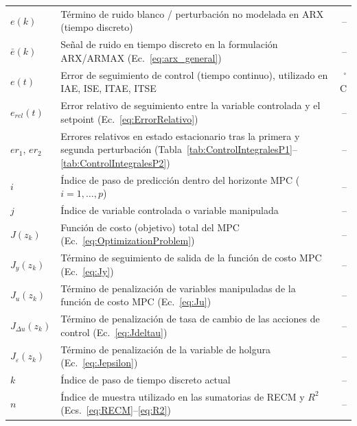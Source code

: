 \begin{longtable}{@{} l p{} r @{}}
$e(k)$
  & Término de ruido blanco / perturbación no modelada en ARX (tiempo discreto)
  & -- \\

$\bar{e}(k)$
  & Señal de ruido en tiempo discreto en la formulación ARX/ARMAX (Ec.~\ref{eq:arx_general})
  & -- \\

$e(t)$
  & Error de seguimiento de control (tiempo continuo), utilizado en IAE, ISE, ITAE, ITSE
  & $^{\circ}$C \\

$e_{rel}(t)$
  & Error relativo de seguimiento entre la variable controlada y el setpoint (Ec.~\ref{eq:ErrorRelativo})
  & -- \\

$er_1,\,er_2$
  & Errores relativos en estado estacionario tras la primera y segunda perturbación (Tabla~\ref{tab:ControlIntegralesP1}--\ref{tab:ControlIntegralesP2})
  & -- \\

$i$
  & Índice de paso de predicción dentro del horizonte MPC ($i=1,\ldots,p$)
  & -- \\

$j$
  & Índice de variable controlada o variable manipulada
  & -- \\

$J(z_k)$
  & Función de costo (objetivo) total del MPC (Ec.~\ref{eq:OptimizationProblem})
  & -- \\

$J_y(z_k)$
  & Término de seguimiento de salida de la función de costo MPC (Ec.~\ref{eq:Jy})
  & -- \\

$J_u(z_k)$
  & Término de penalización de variables manipuladas de la función de costo MPC (Ec.~\ref{eq:Ju})
  & -- \\

$J_{\Delta u}(z_k)$
  & Término de penalización de tasa de cambio de las acciones de control (Ec.~\ref{eq:Jdeltau})
  & -- \\

$J_{\varepsilon}(z_k)$
  & Término de penalización de la variable de holgura (Ec.~\ref{eq:Jepsilon})
  & -- \\

$k$
  & Índice de paso de tiempo discreto actual
  & -- \\

$n$
  & Índice de muestra utilizado en las sumatorias de RECM y $R^2$ (Ecs.~\ref{eq:RECM}--\ref{eq:R2})
  & -- \\


\end{longtable}
